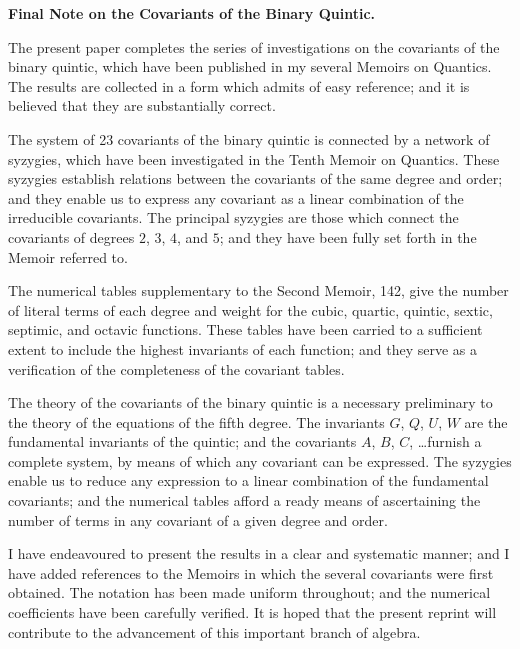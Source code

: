 \documentclass[11pt,a4paper]{article}
\begin{document}
\clearpage
\setcounter{page}{309}

\begin{center}
\textbf{Final Note on the Covariants of the Binary Quintic.}
\end{center}

The present paper completes the series of investigations on the covariants of the binary quintic, which have been published in my several Memoirs on Quantics. The results are collected in a form which admits of easy reference; and it is believed that they are substantially correct.

The system of 23 covariants of the binary quintic is connected by a network of syzygies, which have been investigated in the Tenth Memoir on Quantics. These syzygies establish relations between the covariants of the same degree and order; and they enable us to express any covariant as a linear combination of the irreducible covariants. The principal syzygies are those which connect the covariants of degrees $2$, $3$, $4$, and $5$; and they have been fully set forth in the Memoir referred to.

The numerical tables supplementary to the Second Memoir, 142, give the number of literal terms of each degree and weight for the cubic, quartic, quintic, sextic, septimic, and octavic functions. These tables have been carried to a sufficient extent to include the highest invariants of each function; and they serve as a verification of the completeness of the covariant tables.

\clearpage
\setcounter{page}{310}

The theory of the covariants of the binary quintic is a necessary preliminary to the theory of the equations of the fifth degree. The invariants $G$, $Q$, $U$, $W$ are the fundamental invariants of the quintic; and the covariants $A$, $B$, $C$, \ldots furnish a complete system, by means of which any covariant can be expressed. The syzygies enable us to reduce any expression to a linear combination of the fundamental covariants; and the numerical tables afford a ready means of ascertaining the number of terms in any covariant of a given degree and order.

I have endeavoured to present the results in a clear and systematic manner; and I have added references to the Memoirs in which the several covariants were first obtained. The notation has been made uniform throughout; and the numerical coefficients have been carefully verified. It is hoped that the present reprint will contribute to the advancement of this important branch of algebra.
\end{document}

